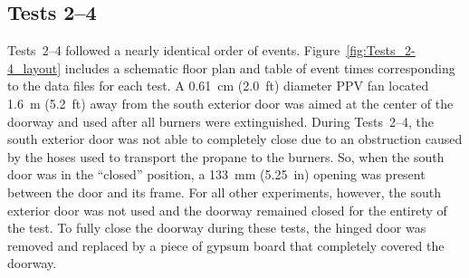 \subsection{Tests 2--4}
Tests~2--4 followed a nearly identical order of events. Figure~\ref{fig:Tests_2-4_layout} includes a schematic floor plan and table of event times corresponding to the data files for each test. A 0.61~cm (2.0~ft) diameter PPV fan located 1.6~m (5.2~ft) away from the south exterior door was aimed at the center of the doorway and used after all burners were extinguished. During Tests~2--4, the south exterior door was not able to completely close due to an obstruction caused by the hoses used to transport the propane to the burners. So, when the south door was in the ``closed'' position, a 133~mm (5.25~in) opening was present between the door and its frame. For all other experiments, however, the south exterior door was not used and the doorway remained closed for the entirety of the test. To fully close the doorway during these tests, the hinged door was removed and replaced by a piece of gypsum board that completely covered the doorway.
\\

